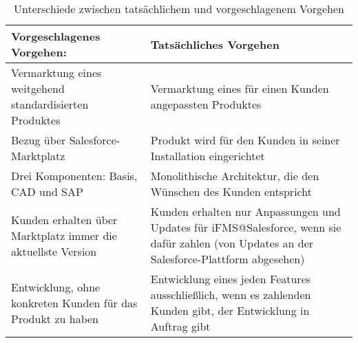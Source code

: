 \begin{table}[h]
\centering
\begin{tabular}{|p{}|p{}|}
\hline
\textbf{Vorgeschlagenes Vorgehen:} & \textbf{Tatsächliches Vorgehen} \\
\hline
Vermarktung eines weitgehend standardisierten Produktes & Vermarktung eines für 
einen Kunden angepassten Produktes \\
\hline
Bezug über Salesforce-Marktplatz & Produkt wird für den Kunden in 
seiner Installation eingerichtet \\
\hline
Drei Komponenten: Basis, CAD und SAP & Monolithische Architektur, die den 
Wünschen des Kunden entspricht \\
\hline
Kunden erhalten über Marktplatz immer die aktuellste Version & Kunden erhalten 
nur Anpassungen und Updates für iFMS@Salesforce, wenn sie dafür zahlen (von Updates
an der Salesforce-Plattform abgesehen) \\
\hline
Entwicklung, ohne konkreten Kunden für das Produkt zu haben & Entwicklung 
eines jeden Features ausschließlich, wenn es zahlenden Kunden gibt, der 
Entwicklung in Auftrag gibt \\
\hline
\end{tabular}
\caption{Unterschiede zwischen tatsächlichem und vorgeschlagenem Vorgehen}
\label{tab:unterschiede_im_vorgehen}
\end{table}